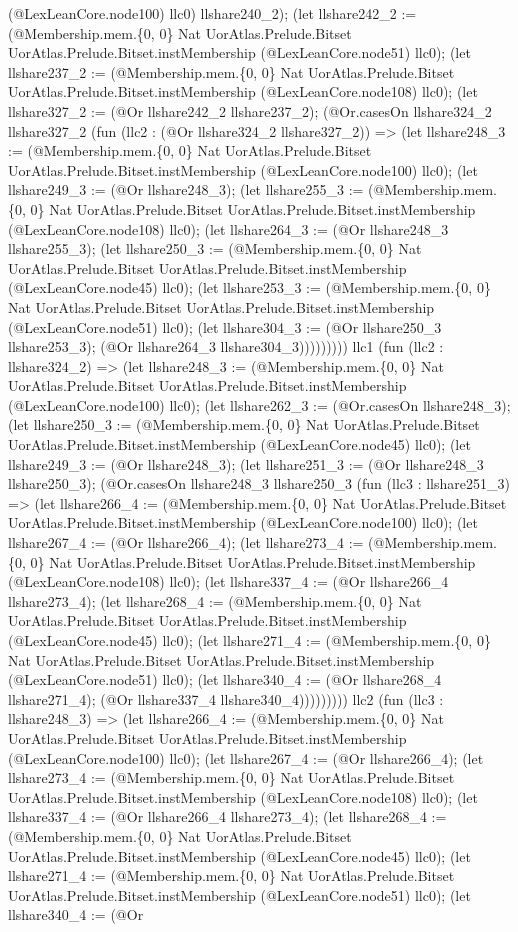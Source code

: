\documentclass[11pt]{article}
\begin{document}
(@LexLeanCore.node100) llc0) llshare240\_2); (let llshare242\_2 := (@Membership.mem.\{0, 0\} Nat UorAtlas.Prelude.Bitset UorAtlas.Prelude.Bitset.instMembership (@LexLeanCore.node51) llc0); (let llshare237\_2 := (@Membership.mem.\{0, 0\} Nat UorAtlas.Prelude.Bitset UorAtlas.Prelude.Bitset.instMembership (@LexLeanCore.node108) llc0); (let llshare327\_2 := (@Or llshare242\_2 llshare237\_2); (@Or.casesOn llshare324\_2 llshare327\_2 (fun (llc2 : (@Or llshare324\_2 llshare327\_2)) => (let llshare248\_3 := (@Membership.mem.\{0, 0\} Nat UorAtlas.Prelude.Bitset UorAtlas.Prelude.Bitset.instMembership (@LexLeanCore.node100) llc0); (let llshare249\_3 := (@Or llshare248\_3); (let llshare255\_3 := (@Membership.mem.\{0, 0\} Nat UorAtlas.Prelude.Bitset UorAtlas.Prelude.Bitset.instMembership (@LexLeanCore.node108) llc0); (let llshare264\_3 := (@Or llshare248\_3 llshare255\_3); (let llshare250\_3 := (@Membership.mem.\{0, 0\} Nat UorAtlas.Prelude.Bitset UorAtlas.Prelude.Bitset.instMembership (@LexLeanCore.node45) llc0); (let llshare253\_3 := (@Membership.mem.\{0, 0\} Nat UorAtlas.Prelude.Bitset UorAtlas.Prelude.Bitset.instMembership (@LexLeanCore.node51) llc0); (let llshare304\_3 := (@Or llshare250\_3 llshare253\_3); (@Or llshare264\_3 llshare304\_3))))))))) llc1 (fun (llc2 : llshare324\_2) => (let llshare248\_3 := (@Membership.mem.\{0, 0\} Nat UorAtlas.Prelude.Bitset UorAtlas.Prelude.Bitset.instMembership (@LexLeanCore.node100) llc0); (let llshare262\_3 := (@Or.casesOn llshare248\_3); (let llshare250\_3 := (@Membership.mem.\{0, 0\} Nat UorAtlas.Prelude.Bitset UorAtlas.Prelude.Bitset.instMembership (@LexLeanCore.node45) llc0); (let llshare249\_3 := (@Or llshare248\_3); (let llshare251\_3 := (@Or llshare248\_3 llshare250\_3); (@Or.casesOn llshare248\_3 llshare250\_3 (fun (llc3 : llshare251\_3) => (let llshare266\_4 := (@Membership.mem.\{0, 0\} Nat UorAtlas.Prelude.Bitset UorAtlas.Prelude.Bitset.instMembership (@LexLeanCore.node100) llc0); (let llshare267\_4 := (@Or llshare266\_4); (let llshare273\_4 := (@Membership.mem.\{0, 0\} Nat UorAtlas.Prelude.Bitset UorAtlas.Prelude.Bitset.instMembership (@LexLeanCore.node108) llc0); (let llshare337\_4 := (@Or llshare266\_4 llshare273\_4); (let llshare268\_4 := (@Membership.mem.\{0, 0\} Nat UorAtlas.Prelude.Bitset UorAtlas.Prelude.Bitset.instMembership (@LexLeanCore.node45) llc0); (let llshare271\_4 := (@Membership.mem.\{0, 0\} Nat UorAtlas.Prelude.Bitset UorAtlas.Prelude.Bitset.instMembership (@LexLeanCore.node51) llc0); (let llshare340\_4 := (@Or llshare268\_4 llshare271\_4); (@Or llshare337\_4 llshare340\_4))))))))) llc2 (fun (llc3 : llshare248\_3) => (let llshare266\_4 := (@Membership.mem.\{0, 0\} Nat UorAtlas.Prelude.Bitset UorAtlas.Prelude.Bitset.instMembership (@LexLeanCore.node100) llc0); (let llshare267\_4 := (@Or llshare266\_4); (let llshare273\_4 := (@Membership.mem.\{0, 0\} Nat UorAtlas.Prelude.Bitset UorAtlas.Prelude.Bitset.instMembership (@LexLeanCore.node108) llc0); (let llshare337\_4 := (@Or llshare266\_4 llshare273\_4); (let llshare268\_4 := (@Membership.mem.\{0, 0\} Nat UorAtlas.Prelude.Bitset UorAtlas.Prelude.Bitset.instMembership (@LexLeanCore.node45) llc0); (let llshare271\_4 := (@Membership.mem.\{0, 0\} Nat UorAtlas.Prelude.Bitset UorAtlas.Prelude.Bitset.instMembership (@LexLeanCore.node51) llc0); (let llshare340\_4 := (@Or 
\end{document}

